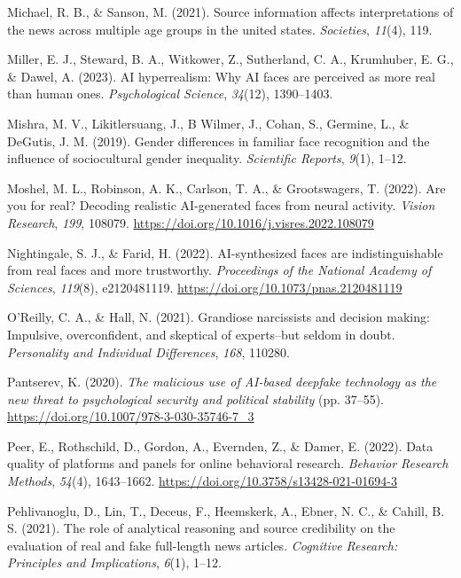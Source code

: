 \documentclass[
  man,
  floatsintext,
  longtable,
  nolmodern,
  notxfonts,
  notimes,
  colorlinks=true,linkcolor=blue,citecolor=blue,urlcolor=blue]{apa7}
\newlength{\cslhangindent}
\newenvironment{CSLReferences}[2] %
 {\begin{list}{}{%
  \setlength{\itemindent}{0pt}
  \setlength{\leftmargin}{0pt}
  \setlength{\parsep}{0pt}
  \ifodd #1
   \setlength{\leftmargin}{\cslhangindent}
   \setlength{\itemindent}{-1\cslhangindent}
  \fi
  \setlength{\itemsep}{#2\baselineskip}}}
 {\end{list}}
\begin{document}
\begin{CSLReferences}{1}{0}
Michael, R. B., \& Sanson, M. (2021). Source information affects
interpretations of the news across multiple age groups in the united
states. \emph{Societies}, \emph{11}(4), 119.

Miller, E. J., Steward, B. A., Witkower, Z., Sutherland, C. A.,
Krumhuber, E. G., \& Dawel, A. (2023). AI hyperrealism: Why AI faces are
perceived as more real than human ones. \emph{Psychological Science},
\emph{34}(12), 1390--1403.

Mishra, M. V., Likitlersuang, J., B Wilmer, J., Cohan, S., Germine, L.,
\& DeGutis, J. M. (2019). Gender differences in familiar face
recognition and the influence of sociocultural gender inequality.
\emph{Scientific Reports}, \emph{9}(1), 1--12.

Moshel, M. L., Robinson, A. K., Carlson, T. A., \& Grootswagers, T.
(2022). Are you for real? Decoding realistic AI-generated faces from
neural activity. \emph{Vision Research}, \emph{199}, 108079.
\url{https://doi.org/10.1016/j.visres.2022.108079}

Nightingale, S. J., \& Farid, H. (2022). AI-synthesized faces are
indistinguishable from real faces and more trustworthy.
\emph{Proceedings of the National Academy of Sciences}, \emph{119}(8),
e2120481119. \url{https://doi.org/10.1073/pnas.2120481119}

O'Reilly, C. A., \& Hall, N. (2021). Grandiose narcissists and decision
making: Impulsive, overconfident, and skeptical of experts--but seldom
in doubt. \emph{Personality and Individual Differences}, \emph{168},
110280.

Pantserev, K. (2020). \emph{The malicious use of AI-based deepfake
technology as the new threat to psychological security and political
stability} (pp. 37--55).
\url{https://doi.org/10.1007/978-3-030-35746-7_3}

Peer, E., Rothschild, D., Gordon, A., Evernden, Z., \& Damer, E. (2022).
Data quality of platforms and panels for online behavioral research.
\emph{Behavior Research Methods}, \emph{54}(4), 1643--1662.
\url{https://doi.org/10.3758/s13428-021-01694-3}

Pehlivanoglu, D., Lin, T., Deceus, F., Heemskerk, A., Ebner, N. C., \&
Cahill, B. S. (2021). The role of analytical reasoning and source
credibility on the evaluation of real and fake full-length news
articles. \emph{Cognitive Research: Principles and Implications},
\emph{6}(1), 1--12.


\end{CSLReferences}
\end{document}
